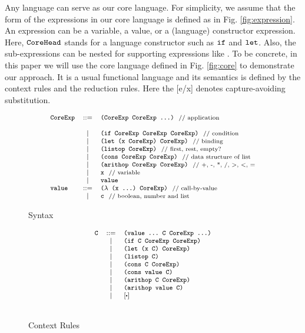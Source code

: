 Any language can serve as our core language. For simplicity, we assume that the form of the expressions in our core language is defined as in Fig. \ref{fig:expression}. An expression can be a variable, a value, or a (language) constructor expression. Here, $\mbox{\tt CoreHead}$ stands for a language constructor such as $\mbox{\tt if}$ and $\mbox{\tt let}$. Also, the sub-expressions can be nested for supporting expressions like . To be concrete, in this paper we will use the core language defined in Fig.  \ref{fig:core} to demonstrate our approach. It is a usual functional language and its semantics is defined by the context rules and the reduction rules. Here the [e/x] denotes capture-avoiding substitution.

\begin{figure*}[t]
\begin{subfigure}{0.55\linewidth}
\[
{\footnotesize
		\begin{array}{lcl}
		\mbox{\tt CoreExp} &::=& \texttt{(CoreExp~CoreExp~...)} ~~\mbox{{\scriptsize // application}}\\\\

		&|& \mbox{\tt (if~CoreExp~CoreExp~CoreExp)} ~~\mbox{{\scriptsize // condition}}\\
		&|& \mbox{\tt (let~(x~CoreExp)~CoreExp)} ~~\mbox{{\scriptsize // binding}}\\
		&|& \mbox{\tt (listop~CoreExp)} ~~\mbox{{\scriptsize // first, rest, empty?}}\\
		&|& \mbox{\tt (cons~CoreExp~CoreExp)} ~~\mbox{{\scriptsize // data structure of list}}\\
		&|& \mbox{\tt (arithop~CoreExp~CoreExp)} ~~\mbox{{\scriptsize // +, -, *, /, >, <, =}}\\
		&|& \mbox{\tt x} ~~\mbox{{\scriptsize // variable}}\\
		&|& \mbox{\tt value}\\
		\mbox{\tt value} &::=& \mbox{\tt ($\lambda$~(x~...)~CoreExp)} ~~\mbox{{\scriptsize // call-by-value}}\\
		&|& \mbox{\tt c} ~~\mbox{{\scriptsize // boolean, number and list}}
		\end{array}
}
\]
\caption{Syntax}
\end{subfigure}
\begin{subfigure}{0.4\linewidth}
\[
{\footnotesize
		\begin{array}{lcl}
		\Code{C} &::=& \Code{(value~...~C~CoreExp~...)}\\
		&|& \Code{(if~C~CoreExp~CoreExp)}\\
		&|& \Code{(let~(x~C)~CoreExp)}\\
		&|& \Code{(listop~C)}\\
		&|& \Code{(cons~C~CoreExp)}\\
		&|& \Code{(cons~value~C)}\\
		&|& \Code{(arithop~C~CoreExp)}\\
		&|& \Code{(arithop~value~C)}\\
		&|& [\bigcdot]\\[1.5em]
		\end{array}
}
\]
\caption{Context Rules}
\end{subfigure}


\end{figure*}
